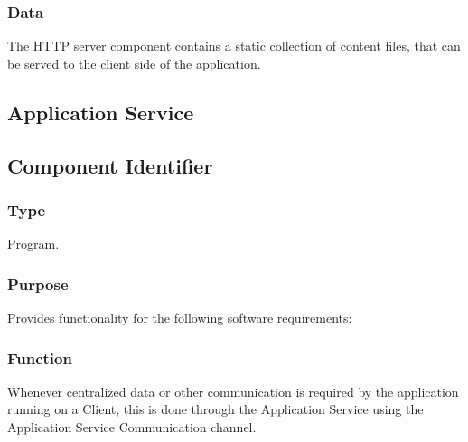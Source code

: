 \subsubsection*{Data}
The HTTP server component contains a static collection of content files, that can be served to the client side of the application.

\subsection{Application Service}
\label{subsec:appservice}

\subsection*{Component Identifier}
\RTMSAS{}

\subsubsection*{Type}
Program.

\subsubsection*{Purpose}
Provides functionality for the following software requirements:

\noindent {}

\subsubsection*{Function}
Whenever centralized data or other communication is required by the application running on a Client, this is done through the Application Service using the Application Service Communication channel.

